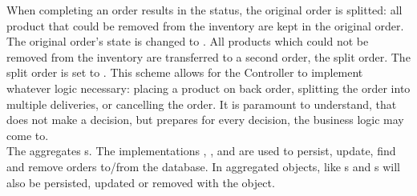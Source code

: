 When completing an order results in the  status, the original order is splitted: all product that could be removed from the inventory are kept in the original order.
The original order's state is changed to .
All products which could not be removed from the inventory are transferred to a second order, the split order. The split order is set to .
This scheme allows for the Controller to implement whatever logic necessary: placing a product on back order, splitting the order into multiple deliveries, or cancelling the order.
It is paramount to understand, that  does not make a decision, but prepares for every decision, the business logic may come to.
\\

The  aggregates s.
The implementations , , and  are used to persist, update, find and remove orders to/from the database.
In  aggregated objects, like s and s will also be persisted, updated or removed with the  object.

